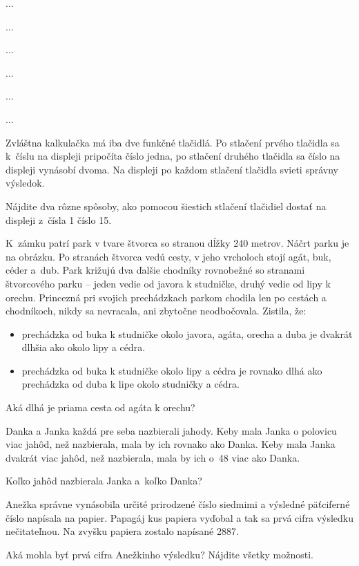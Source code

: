 {%
...}

{%
...}

{%
...}

{%
...}

{%
...}

{%
...}

{%
Zvláštna kalkulačka má iba dve funkčné tlačidlá. Po stlačení prvého tlačidla sa k~číslu na displeji pripočíta číslo jedna, po stlačení druhého tlačidla sa číslo na displeji vynásobí dvoma.
Na displeji po každom stlačení tlačidla svieti správny výsledok.

Nájdite dva rôzne spôsoby, ako pomocou šiestich stlačení tlačidiel dostať na displeji z~čísla 1 číslo 15.
}

{%
K~zámku patrí park v tvare štvorca so stranou dĺžky 240 metrov. Náčrt parku je na obrázku.
Po stranách štvorca vedú cesty, v jeho vrcholoch stojí agát, buk, céder a~dub.
Park križujú dva ďalšie chodníky rovnobežné so stranami štvorcového parku -- jeden vedie od javora k studničke, druhý vedie od lipy k orechu.
Princezná pri svojich prechádzkach parkom chodila len po cestách a chodníkoch, nikdy sa nevracala, ani zbytočne neodbočovala. Zistila, že:
\begin{itemize}
  \item prechádzka od buka k studničke okolo javora, agáta, orecha a duba je dvakrát dlhšia ako okolo lipy a cédra.
  \item prechádzka od buka k studničke okolo lipy a cédra je rovnako dlhá ako prechádzka od duba k lipe okolo studničky a cédra.
\end{itemize}
Aká dlhá je priama cesta od agáta k orechu?
%
}

{%
Danka a Janka každá pre seba nazbierali jahody. Keby mala Janka o polovicu viac jahôd, než nazbierala, mala by ich rovnako ako Danka.
Keby mala Janka dvakrát viac jahôd, než nazbierala, mala by ich o~48 viac ako Danka.

Koľko jahôd nazbierala Janka a~koľko Danka?
}

{%
Anežka správne vynásobila určité prirodzené číslo siedmimi a výsledné päťciferné číslo napísala na papier.
Papagáj kus papiera vyďobal a tak sa prvá cifra výsledku nečitateľnou.
Na zvyšku papiera zostalo napísané 2887.

Aká mohla byť prvá cifra Anežkinho výsledku?
Nájdite všetky možnosti.
}

